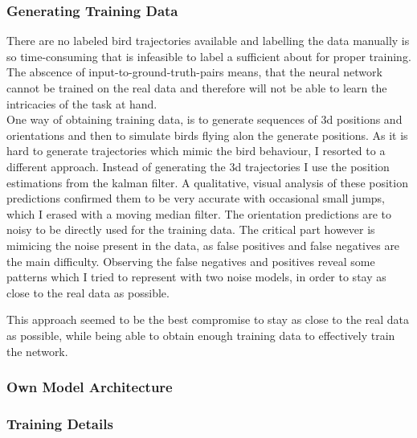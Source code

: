 \documentclass{article}
\begin{document}
\subsubsection{Generating Training Data}
\label{training_data}
There are no labeled bird trajectories available and labelling the data manually is so time-consuming that is infeasible to label a sufficient about for proper training. The abscence of input-to-ground-truth-pairs means, that the neural network cannot be trained on the real data and therefore will not be able to learn the intricacies of the task at hand. \\
One way of obtaining training data, is to generate sequences of 3d positions and orientations and then to simulate birds flying alon the generate positions. As it is hard to generate trajectories which mimic the bird behaviour, I resorted to a different approach. Instead of generating the 3d trajectories I use the position estimations from the kalman filter. A qualitative, visual analysis of these position predictions confirmed them to be very accurate with occasional small jumps, which I erased with a moving median filter. The orientation predictions are to noisy to be directly used for the training data. %
The critical part however is mimicing the noise present in the data, as false positives and false negatives are the main difficulty. Observing the false negatives and positives reveal some patterns which I tried to represent with two noise models, in order to stay as close to the real data as possible.

This approach seemed to be the best compromise to stay as close to the real data as possible, while being able to obtain enough training data to effectively train the network.




\subsubsection{Own Model Architecture}

\subsubsection{Training Details}
\end{document}

